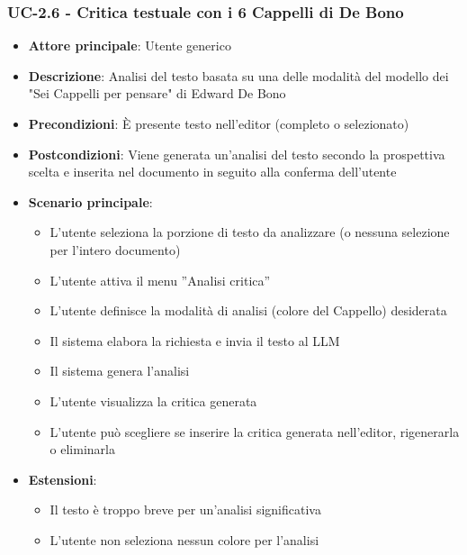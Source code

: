 \documentclass[11pt,a4paper]{article}
\begin{document}
\subsubsection{UC-2.6 - Critica testuale con i 6 Cappelli di De Bono}
\begin{itemize}
    \item \textbf{Attore principale}: Utente generico
    \item \textbf{Descrizione}: Analisi del testo basata su una delle modalità del modello dei "Sei Cappelli per pensare" di Edward De Bono
    \item \textbf{Precondizioni}: È presente testo nell’editor (completo o selezionato)
    \item \textbf{Postcondizioni}: Viene generata un’analisi del testo secondo la prospettiva scelta e inserita nel documento in seguito alla conferma dell'utente
    \item \textbf{Scenario principale}:
    \begin{itemize}
        \item L’utente seleziona la porzione di testo da analizzare (o nessuna selezione per l'intero documento)
        \item L’utente attiva il menu ”Analisi critica”
        \item L’utente definisce la modalità di analisi (colore del Cappello) desiderata
        \item Il sistema elabora la richiesta e invia il testo al LLM
        \item Il sistema genera l'analisi 
        \item L'utente visualizza la critica generata
        \item L'utente può scegliere se inserire la critica generata nell'editor, rigenerarla o eliminarla
    \end{itemize}
    \item \textbf{Estensioni}:
    \begin{itemize}
        \item Il testo è troppo breve per un’analisi significativa
        \item L’utente non seleziona nessun colore per l’analisi
    \end{itemize}
\end{itemize}
\end{document}
